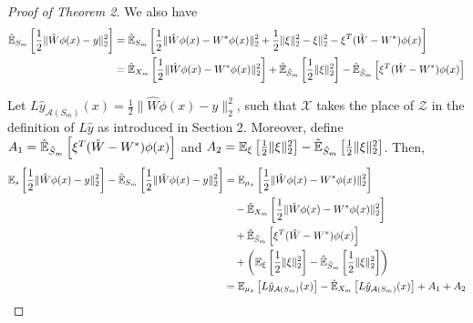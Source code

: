 \documentclass{article}
\begin{document}
\begin{proof}[Proof of Theorem 2]
    We also have
    \begin{align*}
        \hat{\mathbb{E}}_{S_m} \left[ \frac{1}{2} \lVert \hat{W} \phi(x) - y \rVert_{2}^{2} \right] & = \hat{\mathbb{E}}_{S_m} \left[ \frac{1}{2} \lVert \hat{W} \phi(x) - W^* \phi(x) \rVert_2^2 + \frac{1}{2} \lVert \xi \rVert_2^2 - \xi \rVert_2^2 - \xi^T(\hat{W} - W^*) \phi(x) \right] \\
        & = \hat{\mathbb{E}}_{X_m} \left[\frac{1}{2} \lVert \hat{W} \phi(x) - W^* \phi(x) \rVert_2^2 \right] + \hat{\mathbb{E}}_{\Tilde{S}_m} \left[\frac{1}{2} \lVert \xi \rVert_2^2 \right] - \hat{\mathbb{E}}_{\Tilde{S}_m} \left[\xi^T(\hat{W} - W^*) \phi(x) \right]
    \end{align*}

    Let $L\hat{y}_{\mathcal{A}(S_m)} (x) = \frac{1}{2} \lVert \hat{W} \phi(x) - y \rVert_{2}^{2}$, such that $\mathcal{X}$ takes the place of $\mathcal{Z}$ in the definition of $L\hat{y}$ as introduced in Section 2. Moreover, define $A_1 = \hat{\mathbb{E}}_{\Tilde{S}_m} \left[\xi^T (\hat{W} - W^*) \phi(x) \right]$ and $A_2 = \mathbb{E}_{\xi} \left[\frac{1}{2} \lVert \xi \rVert_2^2 \right] - \hat{\mathbb{E}}_{\Tilde{S}_m} \left[\frac{1}{2} \lVert \xi \rVert_2^2 \right]$. Then,
    \begin{align*}
        \mathbb{E}_{s} \left[ \frac{1}{2} \lVert \hat{W} \phi(x) - y \rVert_{2}^{2} \right] - \hat{\mathbb{E}}_{S_m} \left[ \frac{1}{2} \lVert \hat{W} \phi(x) - y \rVert_{2}^{2} \right] & = \mathbb{E}_{\mu_x} \left[ \frac{1}{2} \lVert \hat{W} \phi(x) - W^* \phi(x) \rVert_2^2 \right] \\
        & \quad - \hat{\mathbb{E}}_{X_m} \left[\frac{1}{2} \lVert \hat{W} \phi(x) - W^* \phi(x) \rVert_2^2 \right] \\
        & \quad + \hat{\mathbb{E}}_{\Tilde{S}_m} \left[\xi^T(\hat{W} - W^*) \phi(x) \right] \\
        & \quad + \left(\mathbb{E}_{\xi} \left[\frac{1}{2} \lVert \xi \rVert_2^2 \right] - \hat{\mathbb{E}}_{\Tilde{S}_m} \left[\frac{1}{2} \lVert \xi \rVert_2^2 \right]\right) \\
        & =  \mathbb{E}_{\mu_x} \left[ L\hat{y}_{\mathcal{A}(S_m)} (x) \right] - \hat{\mathbb{E}}_{X_m} \left[L\hat{y}_{\mathcal{A}(S_m)} (x) \right] + A_1 + A_2
    \end{align*}


\end{proof}
\end{document}
